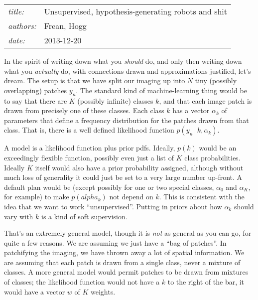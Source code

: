 \documentclass[12pt]{article}
\newcommand{\given}{\,|\,}
\begin{document}
\sloppy\sloppypar

\noindent
\begin{tabular}{ll}
\textsl{title:} & Unsupervised, hypothesis-generating robots and shit \\
\textsl{authors:} & Frean, Hogg \\
\textsl{date:}    & 2013-12-20
\end{tabular}
\bigskip

In the spirit of writing down what you \emph{should} do,
  and only then writing down what you \emph{actually} do,
  with connections drawn and approximations justified,
  let's dream.
The setup is that we have split our imaging up into $N$ tiny
  (possibly overlapping) patches $y_n$.
The standard kind of machine-learning thing would be to
  say that there are $K$ (possibly infinite) classes $k$,
  and that each image patch is drawn from precisely one of these classes.
Each class $k$ has a vector $\alpha_k$ of parameters
  that define a frequency distribution
  for the patches drawn from that class.
That is, there is a well defined likelihood function $p(y_n\given k, \alpha_k)$.

A model is a likelihood function plus prior pdfs.
Ideally, $p(k)$ would be an exceedingly flexible function,
  possibly even just a list of $K$ class probabilities.
Ideally $K$ itself would also have a prior probability assigned,
  although without much loss of generality
  it could just be set to a very large number up-front.
A default plan would be 
  (except possibly for one or two special classes,
   $\alpha_0$ and $\alpha_K$, for example)
  to make $p(alpha_k)$ not depend on $k$.
This is consistent with the idea that we want to work ``unsupervised''.
Putting in priors about how $\alpha_k$ should vary with $k$ is a kind of soft supervision.

That's an extremely general model,
  though it is \emph{not} as general as you can go,
  for quite a few reasons.
We are assuming we just have a ``bag of patches''.
In patchifying the imaging, we have thrown away a lot of spatial information.
We are assuming that each patch is drawn from a single class,
  never a mixture of classes.
A more general model would permit patches to be drawn from mixtures of classes;
  the likelihood function would not have a $k$ to the right of the bar,
  it would have a vector $w$ of $K$ weights.
\end{document}
